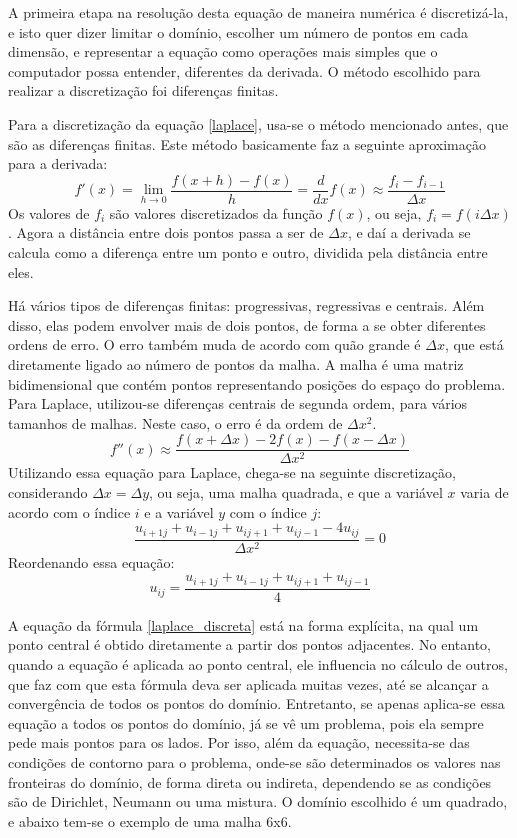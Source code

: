 \documentclass[journal]{IEEEtran}
\begin{document}
A primeira etapa na resolução desta equação de maneira numérica é discretizá-la, e isto quer dizer limitar o domínio, escolher um número de pontos em cada dimensão, e representar a equação como operações mais simples que o computador possa entender, diferentes da derivada. O método escolhido para realizar a discretização foi diferenças finitas.

Para a discretização da equação \ref{laplace}, usa-se o método mencionado antes, que são as diferenças finitas. Este método basicamente faz a seguinte aproximação para a derivada:
\begin{equation}
f'(x)=\lim_{h\rightarrow 0}\frac{f(x+h)-f(x)}{h}=\frac{d}{dx}f(x)\approx \frac{f_i-f_{i-1}}{\Delta x}
\end{equation}
Os valores de $f_i$ são valores discretizados da função $f(x)$, ou seja, $f_i=f(i\Delta x)$. Agora a distância entre dois pontos passa a ser de $\Delta x$, e daí a derivada se calcula como a diferença entre um ponto e outro, dividida pela distância entre eles. 

Há vários tipos de diferenças finitas: progressivas, regressivas e centrais. Além disso, elas podem envolver mais de dois pontos, de forma a se obter diferentes ordens de erro. O erro também muda de acordo com quão grande é $\Delta x$, que está diretamente ligado ao número de pontos da malha. A malha é uma matriz bidimensional que contém pontos representando posições do espaço do problema. Para Laplace, utilizou-se diferenças centrais de segunda ordem, para vários tamanhos de malhas. Neste caso, o erro é da ordem de $\Delta x^2$.
\begin{equation}
f''(x)\approx \frac{f(x+\Delta x)-2f(x)-f(x-\Delta x)}{\Delta x^2}
\end{equation}
Utilizando essa equação para Laplace, chega-se na seguinte discretização, considerando $\Delta x=\Delta y$, ou seja, uma malha quadrada, e que a variável $x$ varia de acordo com o índice $i$ e a variável $y$ com o índice $j$:
\begin{equation}
\frac{u_{i+1j}+u_{i-1j}+u_{ij+1}+u_{ij-1}-4u_{ij}}{\Delta x^2}=0 \label{laplace_discreta_zero}
\end{equation}
Reordenando essa equação:
\begin{equation}
  u_{ij}=\frac{u_{i+1j}+u_{i-1j}+u_{ij+1}+u_{ij-1}}{4} \label{laplace_discreta}
\end{equation}

A equação da fórmula \ref{laplace_discreta} está na forma explícita, na qual um ponto central é obtido diretamente a partir dos pontos adjacentes. No entanto, quando a equação é aplicada ao ponto central, ele influencia no cálculo de outros, que faz com que esta fórmula deva ser aplicada muitas vezes, até se alcançar a convergência de todos os pontos do domínio. Entretanto, se apenas aplica-se essa equação a todos os pontos do domínio, já se vê um problema, pois ela sempre pede mais pontos para os lados. Por isso, além da equação, necessita-se das condições de contorno para o problema, onde-se são determinados os valores nas fronteiras do domínio, de forma direta ou indireta, dependendo se as condições são de Dirichlet, Neumann ou uma mistura. O domínio escolhido é um quadrado, e abaixo tem-se o exemplo de uma malha 6x6.
\end{document}
